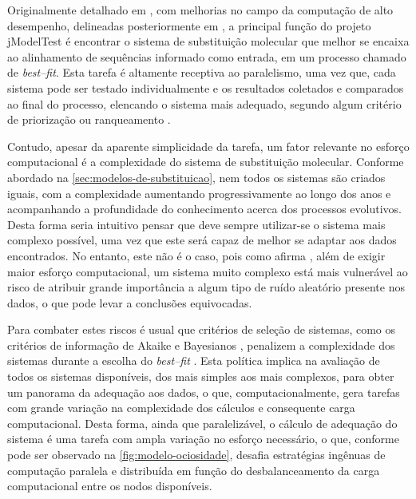 \documentclass[english,brazilian]{UNISINOSmonografia} %
\begin{document}
Originalmente detalhado em , com melhorias no campo da computação de alto desempenho, delineadas posteriormente em , a principal função do projeto jModelTest é encontrar o sistema de substituição molecular que melhor se encaixa ao alinhamento de sequências informado como entrada, em um processo chamado de \textit{best--fit}.
Esta tarefa é altamente receptiva ao paralelismo, uma vez que, cada sistema pode ser testado individualmente e os resultados coletados e comparados ao final do processo, elencando o sistema mais adequado, segundo algum critério de priorização ou ranqueamento \cite{Keane2006a}.


Contudo, apesar da aparente simplicidade da tarefa, um fator relevante no esforço computacional é a complexidade do sistema de substituição molecular.
Conforme abordado na \autoref{sec:modelos-de-substituicao}, nem todos os sistemas são criados iguais, com a complexidade aumentando progressivamente ao longo dos anos e acompanhando a profundidade do conhecimento acerca dos processos evolutivos.
Desta forma seria intuitivo pensar que deve sempre utilizar-se o sistema mais complexo possível, uma vez que este será capaz de melhor se adaptar aos dados encontrados. 
No entanto, este não é o caso, pois como afirma , além de exigir maior esforço computacional, um sistema muito complexo está mais vulnerável ao risco de atribuir grande importância a algum tipo de ruído aleatório presente nos dados, o que pode levar a conclusões equivocadas.


Para combater estes riscos é usual que critérios de seleção de sistemas, como os critérios de informação de Akaike \cite{Akaike1974} e Bayesianos \cite{Schwarz1978}, penalizem a complexidade dos sistemas durante a escolha do \textit{best--fit} \cite{yang2014molecular}.
Esta política implica na avaliação de todos os sistemas disponíveis, dos mais simples aos mais complexos, para obter um panorama da adequação aos dados, o que, computacionalmente, gera tarefas com grande variação na complexidade dos cálculos e consequente carga computacional.
Desta forma, ainda que paralelizável, o cálculo de adequação do sistema é uma tarefa com ampla variação no esforço necessário, o que, conforme pode ser observado na \autoref{fig:modelo-ociosidade}, desafia estratégias ingênuas de computação paralela e distribuída em função do desbalanceamento da carga computacional entre os nodos disponíveis.
\end{document}
